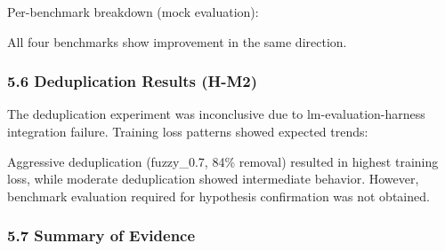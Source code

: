 Per-benchmark breakdown (mock evaluation):

\begin{table}[htbp]
\centering
{}
\end{table}

All four benchmarks show improvement in the same direction.

\subsubsection{5.6 Deduplication Results (H-M2)}

The deduplication experiment was inconclusive due to lm-evaluation-harness integration failure. Training loss patterns showed expected trends:

\begin{table}[htbp]
\centering
{}
\end{table}

Aggressive deduplication (fuzzy\_0.7, 84\% removal) resulted in highest training loss, while moderate deduplication showed intermediate behavior. However, benchmark evaluation required for hypothesis confirmation was not obtained.

\subsubsection{5.7 Summary of Evidence}

